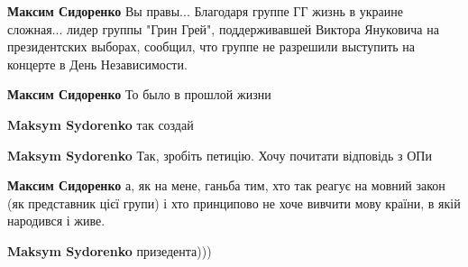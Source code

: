 \begin{itemize}
\begin{itemize}
\textbf{Максим Сидоренко} Вы правы... Благодаря группе ГГ жизнь в украине
сложная... лидер группы "Грин Грей", поддерживавшей Виктора Януковича на
президентских выборах, сообщил, что группе не разрешили выступить на концерте в
День Независимости.

 
\textbf{Максим Сидоренко}
То было в прошлой жизни

 
\textbf{Maksym Sydorenko} так создай

 
\textbf{Maksym Sydorenko} Так, зробіть петицію. Хочу почитати відповідь з ОПи\Laughey[1.0][white]

 
\textbf{Максим Сидоренко} а, як на мене, ганьба тим, хто так реагує на мовний закон (як представник цієї групи) і хто принципово не хоче вивчити мову країни, в якій народився і живе.

 
\textbf{Maksym Sydorenko} призедента)))

 

\end{itemize}
\end{itemize}
